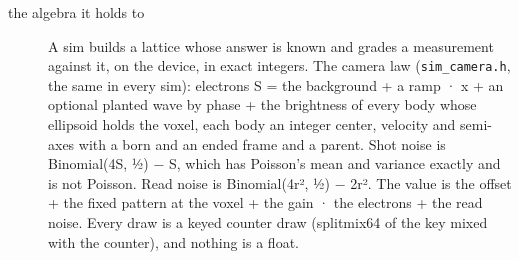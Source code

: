\begin{description}
\item[{the algebra it holds to}] A sim builds a lattice whose answer is known and grades a measurement against it, on the device, in exact integers. The camera law (\texttt{sim\_\allowbreak{}camera.\allowbreak{}h}, the same in every sim): electrons S = the background + a ramp · x + an optional planted wave by phase + the brightness of every body whose ellipsoid holds the voxel, each body an integer center, velocity and semi-axes with a born and an ended frame and a parent. Shot noise is Binomial(4S, ½) − S, which has Poisson's mean and variance exactly and is not Poisson. Read noise is Binomial(4r², ½) − 2r². The value is the offset + the fixed pattern at the voxel + the gain · the electrons + the read noise. Every draw is a keyed counter draw (splitmix64 of the key mixed with the counter), and nothing is a float.

\end{description}
